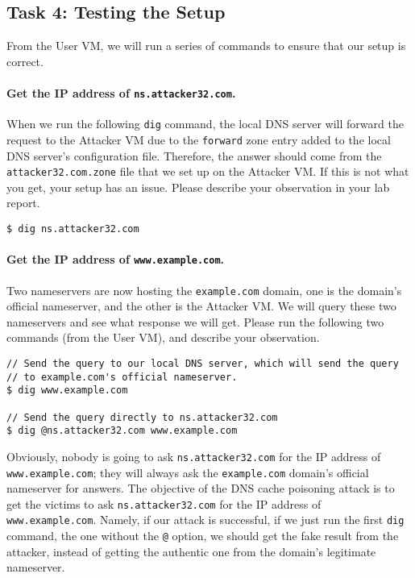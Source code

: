 \subsection{Task 4: Testing the Setup}

From the User VM, we will run a series of commands to ensure 
that our setup is correct. 


\paragraph{Get the IP address of \texttt{ns.attacker32.com}.}
When we run the following \texttt{dig} command, 
the local DNS server will forward the request to the Attacker VM 
due to the \texttt{forward} zone entry added to the local DNS server's
configuration file. Therefore, the answer should come from
the \texttt{attacker32.com.zone} file that we set up on the Attacker VM.
If this is not what you get, your setup has an issue. Please describe your
observation in your lab report. 

\begin{lstlisting}
$ dig ns.attacker32.com
\end{lstlisting}



\paragraph{Get the IP address of \texttt{www.example.com}.} 
Two nameservers are now hosting the \texttt{example.com} 
domain, one is the domain's official nameserver, and the other 
is the Attacker VM. We will query these two nameservers and see what 
response we will get. 
Please run the following two commands (from the User VM), 
and describe your observation. 


\begin{lstlisting}
// Send the query to our local DNS server, which will send the query
// to example.com's official nameserver. 
$ dig www.example.com

// Send the query directly to ns.attacker32.com 
$ dig @ns.attacker32.com www.example.com
\end{lstlisting}
 


Obviously, nobody is going to ask \texttt{ns.attacker32.com} for 
the IP address of \texttt{www.example.com}; they will always ask
the \texttt{example.com} domain's official nameserver for 
answers. The objective of the DNS cache poisoning attack
is to get the victims to ask 
\texttt{ns.attacker32.com} for the IP address of 
\texttt{www.example.com}. Namely, if our attack is successful, 
if we just run the first \texttt{dig} command, the one
without the \texttt{@} option, we should get the 
fake result from the attacker, instead of getting 
the authentic one from the domain's legitimate nameserver.




